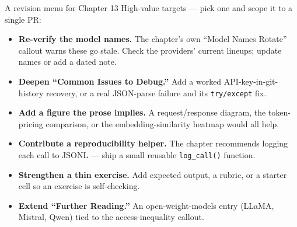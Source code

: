 \documentclass[9pt,aspectratio=169]{beamer}
\begin{document}
\begin{frame}{A revision menu for Chapter 13}
    High-value targets --- pick one and scope it to a single PR:
    \begin{itemize}
        \item \textbf{Re-verify the model names.} The chapter's own ``Model Names Rotate'' callout warns these go stale. Check the providers' current lineups; update names or add a dated note.
        \item \textbf{Deepen ``Common Issues to Debug.''} Add a worked API-key-in-git-history recovery, or a real JSON-parse failure and its \texttt{try/except} fix.
        \item \textbf{Add a figure the prose implies.} A request/response diagram, the token-pricing comparison, or the embedding-similarity heatmap would all help.
        \item \textbf{Contribute a reproducibility helper.} The chapter recommends logging each call to JSONL --- ship a small reusable \texttt{log\_call()} function.
        \item \textbf{Strengthen a thin exercise.} Add expected output, a rubric, or a starter cell so an exercise is self-checking.
        \item \textbf{Extend ``Further Reading.''} An open-weight-models entry (LLaMA, Mistral, Qwen) tied to the access-inequality callout.
    \end{itemize}
\end{frame}
\end{document}
